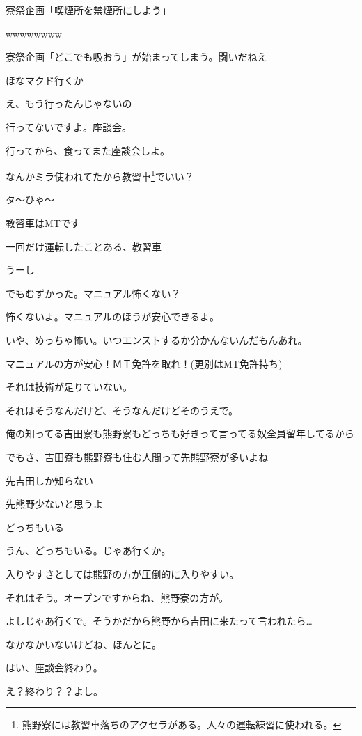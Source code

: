 \begin{multicols}{3}
寮祭企画「喫煙所を禁煙所にしよう」

wwwwwwww

寮祭企画「どこでも吸おう」が始まってしまう。闘いだねえ

ほなマクド行くか

え、もう行ったんじゃないの

行ってないですよ。座談会。

行ってから、食ってまた座談会しよ。

なんかミラ使われてたから教習車\footnote{熊野寮には教習車落ちのアクセラがある。人々の運転練習に使われる。}でいい？

タ～ひゃ～

教習車はMTです

一回だけ運転したことある、教習車

うーし

でもむずかった。マニュアル怖くない？

怖くないよ。マニュアルのほうが安心できるよ。

いや、めっちゃ怖い。いつエンストするか分かんないんだもんあれ。

マニュアルの方が安心！ＭＴ免許を取れ！(更別はMT免許持ち)

それは技術が足りていない。

それはそうなんだけど、そうなんだけどそのうえで。

俺の知ってる吉田寮も熊野寮もどっちも好きって言ってる奴全員留年してるから

でもさ、吉田寮も熊野寮も住む人間って先熊野寮が多いよね

先吉田しか知らない

先熊野少ないと思うよ

どっちもいる

うん、どっちもいる。じゃあ行くか。

入りやすさとしては熊野の方が圧倒的に入りやすい。

それはそう。オープンですからね、熊野寮の方が。

よしじゃあ行くで。そうかだから熊野から吉田に来たって言われたら…

なかなかいないけどね、ほんとに。

はい、座談会終わり。

え？終わり？？よし。

\end{multicols}

